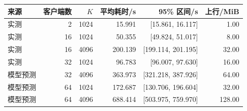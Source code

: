 \begin{tabular}{lrrrrr}
\toprule
来源 & 客户端数 & $K$ & 平均耗时/s & 95\% 区间/s & 上行/MiB \\
\midrule
实测 & 2 & 1024 & 15.991 & [15.861, 16.117] & 1.00 \\
实测 & 16 & 1024 & 50.355 & [49.824, 51.017] & 8.00 \\
实测 & 16 & 4096 & 200.139 & [199.114, 201.195] & 32.00 \\
实测 & 32 & 1024 & 96.783 & [96.007, 97.630] & 16.00 \\
模型预测 & 32 & 4096 & 363.973 & [321.218, 387.926] & 64.00 \\
模型预测 & 64 & 1024 & 172.687 & [130.706, 196.604] & 32.00 \\
模型预测 & 64 & 4096 & 688.414 & [503.975, 759.970] & 128.00 \\
\bottomrule
\end{tabular}
